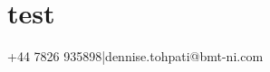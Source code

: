 \documentclass[11pt]{article}
\begin{document}
\section{test}
+44 7826 935898|dennise.tohpati@bmt-ni.com
\end{document}
